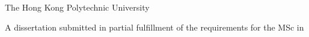 \begin{titlepage}
\centering
{\large The Hong Kong Polytechnic University\par}
\vspace{8mm}
{\large\departmentname\par}
\vspace{20mm}
{\Large\bfseries\disstitle\par}
\vspace{16mm}
{\large\studentname\par}
\vfill
A dissertation submitted in partial fulfillment of the requirements for the MSc in \degreefield
\vspace{18mm}

\initialsubmission
\end{titlepage}

